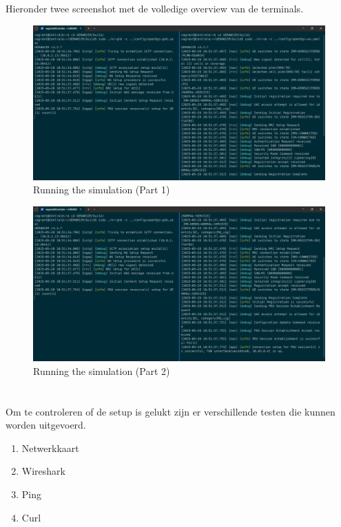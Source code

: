 Hieronder twee screenshot met de volledige overview van de terminals.

\begin{figure}[H]
    \includegraphics[width=\linewidth]{../graphics/POC-Run-1.png}
    \caption{Running the simulation (Part 1)}
    \label{fig:runPart1}
\end{figure}
\begin{figure}[H]
    \includegraphics[width=\linewidth]{../graphics/POC-Run-2.png}
    \caption{Running the simulation (Part 2)}
    \label{fig:runPart2}
\end{figure}

\section{}%
\label{sec:Test}%

Om te controleren of de setup is gelukt zijn er verschillende testen die kunnen worden uitgevoerd.
\begin{enumerate}
    \item Netwerkkaart
    \item Wireshark
    \item Ping
    \item Curl
\end{enumerate}

